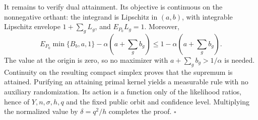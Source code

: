 It remains to verify dual attainment.  Its objective is continuous on the
nonnegative orthant: the integrand is Lipschitz in \((a,b)\), with integrable
Lipschitz envelope \(1+\sum_gL_g\), and \(E_{P_0}L_g=1\).  Moreover,
\[
E_{P_0}\min\{B_b,a,1\}-\alpha\!\left(a+\sum_gb_g\right)
\leq1-\alpha\!\left(a+\sum_gb_g\right).
\]
The value at the origin is zero, so no maximizer with
\(a+\sum_gb_g>1/\alpha\) is needed.  Continuity on the resulting compact
simplex proves that the supremum is attained.  Purifying an attaining primal
kernel yields a measurable rule with no auxiliary randomization.  Its action
is a function only of the likelihood ratios, hence of
\(Y,n,\sigma,h,q\) and the fixed public orbit and confidence level.  Multiplying
the normalized value by \(\delta=q^2/h\) completes the proof. \(\square\)